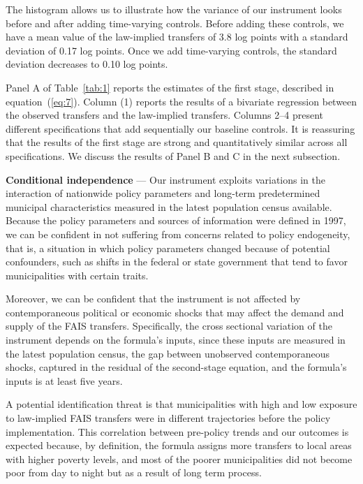 \documentclass[dv_diss_main.tex]{subfiles}
\begin{document}
The histogram allows us to illustrate how the variance of our instrument looks before and after adding time-varying controls. Before adding these controls, we have a mean value of the law-implied transfers of 3.8 log points with a standard deviation of 0.17 log points. Once we add time-varying controls, the standard deviation decreases to 0.10 log points.

Panel A of {Table}~\ref{tab:1} reports the estimates of the first stage, described in {equation}~(\ref{eq:7}). Column (1) reports the results of a bivariate regression between the observed transfers and the law-implied transfers. Columns 2–4 present different specifications that add sequentially our baseline controls. It is reassuring that the results of the first stage are strong and quantitatively similar across all specifications. We discuss the results of Panel B and C in the next subsection.


\textbf{Conditional independence }— Our instrument exploits variations in the interaction of nationwide policy parameters and long-term predetermined municipal characteristics measured in the latest population census available. Because the policy parameters and sources of information were defined in 1997, we can be confident in not suffering from concerns related to policy endogeneity, that is, a situation in which policy parameters changed because of potential confounders, such as shifts in the federal or state government that tend to favor municipalities with certain traits.

Moreover, we can be confident that the instrument is not affected by contemporaneous political or economic shocks that may affect the demand and supply of the FAIS transfers. Specifically, the cross sectional variation of the instrument depends on the formula's inputs, since these inputs are measured in the latest population census, the gap between unobserved contemporaneous shocks, captured in the residual of the second-stage equation, and the formula's inputs is at least five years. 

A potential identification threat is that municipalities with high and low exposure to law-implied FAIS transfers were in different trajectories before the policy implementation. This correlation between pre-policy trends and our outcomes is expected because, by definition, the formula assigns more transfers to local areas with higher poverty levels, and most of the poorer municipalities did not become poor from day to night but as a result of long term process. 
\end{document}
